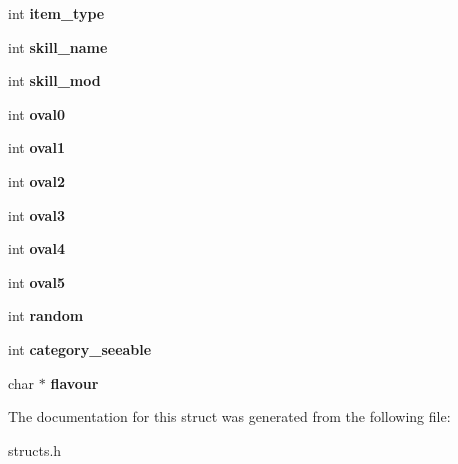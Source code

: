 \begin{DoxyCompactItemize}
\item 
\hypertarget{structvariable__data_a6136f887514ec6b003e2a74442571fe4}{int {\bfseries item\-\_\-type}}\label{structvariable__data_a6136f887514ec6b003e2a74442571fe4}

\item 
\hypertarget{structvariable__data_af163ab07c1d83fbe7d89d967652424c2}{int {\bfseries skill\-\_\-name}}\label{structvariable__data_af163ab07c1d83fbe7d89d967652424c2}

\item 
\hypertarget{structvariable__data_a508e4c50dfc2879ad76d1873516abc4b}{int {\bfseries skill\-\_\-mod}}\label{structvariable__data_a508e4c50dfc2879ad76d1873516abc4b}

\item 
\hypertarget{structvariable__data_ae74f7ca707a04fc37b216bfcbda0d89d}{int {\bfseries oval0}}\label{structvariable__data_ae74f7ca707a04fc37b216bfcbda0d89d}

\item 
\hypertarget{structvariable__data_a2c02fd8cd657583a3a630ae1caa439a6}{int {\bfseries oval1}}\label{structvariable__data_a2c02fd8cd657583a3a630ae1caa439a6}

\item 
\hypertarget{structvariable__data_a6a39fc4450f8f6be1b108185af6ecb5e}{int {\bfseries oval2}}\label{structvariable__data_a6a39fc4450f8f6be1b108185af6ecb5e}

\item 
\hypertarget{structvariable__data_a59405cb2528e1d707fab490b4f93f168}{int {\bfseries oval3}}\label{structvariable__data_a59405cb2528e1d707fab490b4f93f168}

\item 
\hypertarget{structvariable__data_a43fe5fc75e0250205bd04a51b4ae90fc}{int {\bfseries oval4}}\label{structvariable__data_a43fe5fc75e0250205bd04a51b4ae90fc}

\item 
\hypertarget{structvariable__data_a599917c37935a996794bbb3398841a86}{int {\bfseries oval5}}\label{structvariable__data_a599917c37935a996794bbb3398841a86}

\item 
\hypertarget{structvariable__data_afa407c51bacc478d31e291667b9cec01}{int {\bfseries random}}\label{structvariable__data_afa407c51bacc478d31e291667b9cec01}

\item 
\hypertarget{structvariable__data_a7e57f8eacda08a9d68591d0d7a4fb0a0}{int {\bfseries category\-\_\-seeable}}\label{structvariable__data_a7e57f8eacda08a9d68591d0d7a4fb0a0}

\item 
\hypertarget{structvariable__data_a498971b7b1e6ddd5b49de1e8a5449689}{char $\ast$ {\bfseries flavour}}\label{structvariable__data_a498971b7b1e6ddd5b49de1e8a5449689}

\end{DoxyCompactItemize}


The documentation for this struct was generated from the following file\-:\begin{DoxyCompactItemize}
\item 
structs.\-h\end{DoxyCompactItemize}

